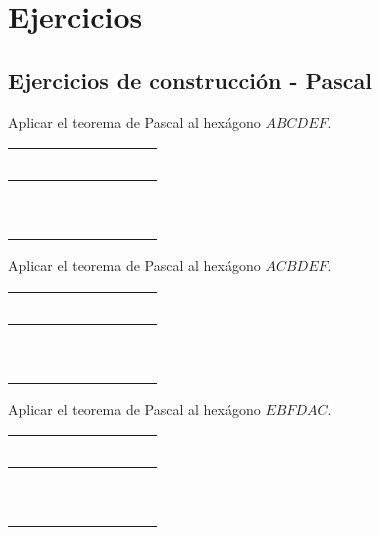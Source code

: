 \section{Ejercicios}

\subsection{Ejercicios de construcción - Pascal}

\begin{section-exercise}
    Aplicar el teorema de Pascal al hexágono $ABCDEF$. \hspace{1cm}
    \begin{tabular}{|c|c|c|}
        \hline
        \ \ \ \ && \\\hline
        &\ \ \ \ & \\\hline\hline
        &&\ \ \ \ \\\hline
    \end{tabular}
    \vspace*{\fill}
    \begin{figure}[H]
        \centering
        
    \end{figure}
    \vspace*{\fill}
\end{section-exercise}

\newpage
\begin{section-exercise}
    Aplicar el teorema de Pascal al hexágono $ACBDEF$. \hspace{1cm}
    \begin{tabular}{|c|c|c|}
        \hline
        \ \ \ \ && \\\hline
        &\ \ \ \ & \\\hline\hline
        &&\ \ \ \ \\\hline
    \end{tabular}
    \vspace*{\fill}
    \begin{figure}[H]
        \centering
        
    \end{figure}
    \vspace*{\fill}
\end{section-exercise}

\newpage
\begin{section-exercise}
    Aplicar el teorema de Pascal al hexágono $EBFDAC$. \hspace{1cm}
    \begin{tabular}{|c|c|c|}
        \hline
        \ \ \ \ && \\\hline
        &\ \ \ \ & \\\hline\hline
        &&\ \ \ \ \\\hline
    \end{tabular}
    \vspace*{\fill}
    \begin{figure}[H]
        \centering
        
    \end{figure}
    \vspace*{\fill}
\end{section-exercise}

